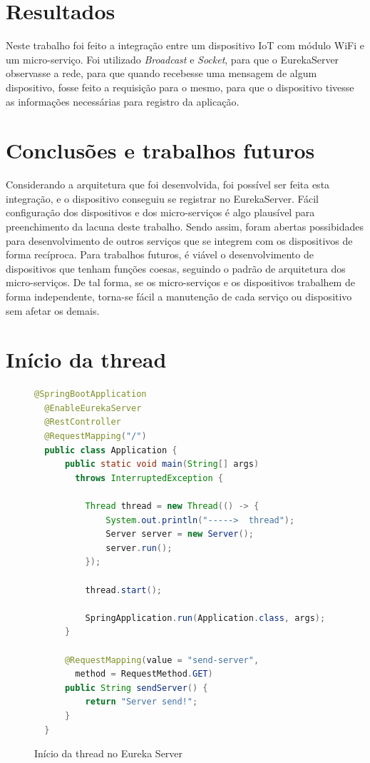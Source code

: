 \documentclass[journal]{IEEEtran}
\begin{document}
\section{Resultados}
Neste trabalho foi feito a integração entre um dispositivo IoT com módulo WiFi e um micro-serviço. Foi utilizado  \emph{Broadcast} e \emph{Socket}, para que o EurekaServer observasse a rede, para que quando recebesse uma mensagem de algum dispositivo, fosse feito a requisição para o mesmo, para que o dispositivo tivesse as informações necessárias para registro da aplicação.   

\section{Conclusões e trabalhos futuros}
Considerando a arquitetura que foi desenvolvida, foi possível ser feita esta integração, e o dispositivo conseguiu se registrar no EurekaServer. Fácil configuração dos dispositivos e dos micro-serviços é algo plausível para preenchimento da lacuna deste trabalho. Sendo assim, foram abertas possibidades para desenvolvimento de outros serviços que se integrem com os dispositivos de forma recíproca. Para trabalhos futuros, é viável o desenvolvimento de dispositivos que tenham funções coesas, seguindo o padrão de arquitetura dos micro-serviços. De tal forma, se os micro-serviços e os dispositivos trabalhem de forma independente, torna-se fácil a manutenção de cada serviço ou dispositivo sem afetar os demais.

\appendices

\section{Início da thread}

\begin{figure}[H]
\centering

\begin{lstlisting}[language=Java]
  @SpringBootApplication
  @EnableEurekaServer
  @RestController
  @RequestMapping("/")
  public class Application {
      public static void main(String[] args) 
        throws InterruptedException {

          Thread thread = new Thread(() -> {
              System.out.println("----->  thread");
              Server server = new Server();
              server.run();
          });

          thread.start();

          SpringApplication.run(Application.class, args);
      }

      @RequestMapping(value = "send-server", 
        method = RequestMethod.GET)
      public String sendServer() {
          return "Server send!";
      }
  }
\end{lstlisting}
\caption{Início da thread no Eureka Server}
\label{broadcasteureka}
\end{figure}
\end{document}
